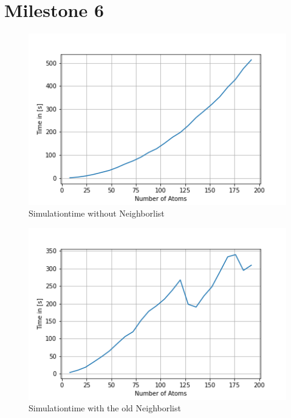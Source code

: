 \section{Milestone 6}

\begin{figure}[!h]
	\begin{center}
		\includegraphics[scale=1]{Figure/plotAtomTimes.png}
	\end{center}
	\caption[Simulationtime without Neighborlist]{Simulationtime without Neighborlist}
	\label{PlotAtomTimesSecond}
\end{figure}
\begin{figure}[!h]
	\begin{center}
		\includegraphics[scale=1]{Figure/plotAtomTimesTree.png}
	\end{center}
	\caption[Simulationtime with the old Neighborlist]{Simulationtime with the old Neighborlist}
	\label{PlotAtomTimesOldNeighbor}
\end{figure}

